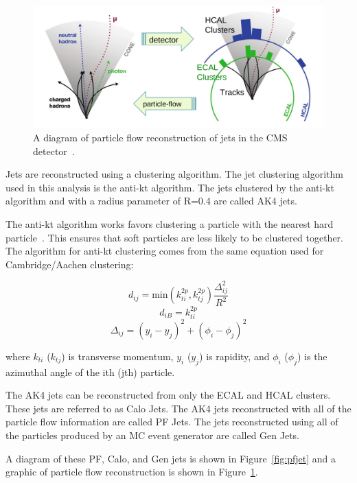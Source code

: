 \begin{figure}[h]
\centering
\includegraphics[width=1.0\textwidth]{figures/particle_flow_pandolfi}
\caption{A diagram of particle flow reconstruction of jets in the CMS detector~\cite{pflow_pandolfi}.}
\label{fig:pflow_jets}
\end{figure}

Jets are reconstructed using a clustering algorithm. The jet clustering algorithm used in this analysis is the anti-kt algorithm. The jets clustered by the anti-kt algorithm and with a radius parameter of R=0.4 are called AK4 jets.

The anti-kt algorithm works favors clustering a particle with the nearest hard particle~\cite{anti-kt}. This ensures that soft particles are less likely to be clustered together. The algorithm for anti-kt clustering comes from the same equation used for Cambridge/Aachen clustering:

\begin{equation}
	d_{ij} = \text{min} \left( k^{2p}_{ti}, k^{2p}_{tj} \right) \frac{\Delta^2_{ij}}{R^2}
\end{equation}
\begin{equation}
	d_{iB} = k^{2p}_{ti}
\end{equation}
\begin{equation}
	\Delta_{ij} = (y_i - y_j)^2 + (\phi_i - \phi_j)^2
\end{equation}

where $k_{ti}$ ($k_{tj}$) is transverse momentum, $y_i$ ($y_j$) is rapidity, and $\phi_i$ ($\phi_j$) is the azimuthal angle of the ith (jth) particle.

The AK4 jets can be reconstructed from only the ECAL and HCAL clusters. These jets are referred to as Calo Jets. The AK4 jets reconstructed with all of the particle flow information are called PF Jets. The jets reconstructed using all of the particles produced by an MC event generator are called Gen Jets. 


A diagram of these PF, Calo, and Gen jets is shown in Figure~\ref{fig:pfjet} and a graphic of particle flow reconstruction is shown in Figure~\ref{fig:pflow_jets}.


